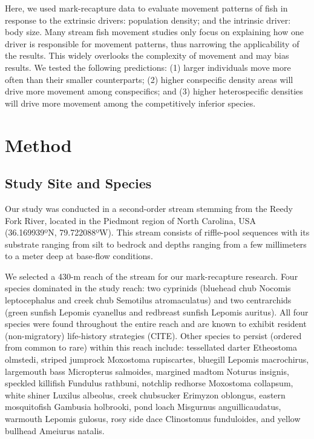 \documentclass[11pt, class=article, crop=false]{standalone}
\begin{document}
Here, we used mark-recapture data to evaluate movement patterns of fish in response to the extrinsic drivers: population density; and the intrinsic driver: body size. Many stream fish movement studies only focus on explaining how one driver is responsible for movement patterns, thus narrowing the applicability of the results. This widely overlooks the complexity of movement and may bias results. We tested the following predictions: (1) larger individuals move more often than their smaller counterparts; (2) higher conspecific density areas will drive more movement among conspecifics; and (3) higher heterospecific densities will drive more movement among the competitively inferior species.

\section{Method}

\subsection{Study Site and Species}

Our study was conducted in a second-order stream stemming from the Reedy Fork River, located in the Piedmont region of North Carolina, USA (36.169939ºN, 79.722088ºW). This stream consists of riffle-pool sequences with its substrate ranging from silt to bedrock and depths ranging from a few millimeters to a meter deep at base-flow conditions. 

We selected a 430-m reach of the stream for our mark-recapture research. Four species dominated in the study reach: two cyprinids (bluehead chub Nocomis leptocephalus and creek chub Semotilus atromaculatus) and two centrarchids (green sunfish Lepomis cyanellus and redbreast sunfish Lepomis auritus). All four species were found throughout the entire reach and are known to exhibit resident (non-migratory) life-history strategies (CITE). Other species to persist (ordered from common to rare) within this reach include: tessellated darter Etheostoma olmstedi, striped jumprock Moxostoma rupiscartes, bluegill Lepomis macrochirus, largemouth bass Micropterus salmoides, margined madtom Noturus insignis, speckled killifish Fundulus rathbuni, notchlip redhorse Moxostoma collapsum, white shiner Luxilus albeolus, creek chubsucker Erimyzon oblongus, eastern mosquitofish Gambusia holbrooki, pond loach Misgurnus anguillicaudatus, warmouth Lepomis gulosus, rosy side dace Clinostomus funduloides, and yellow bullhead Ameiurus natalis. 
\end{document}
